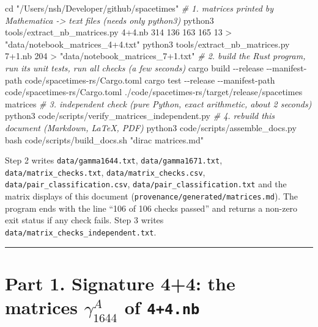 \documentclass[
  10pt,
]{article}
\newenvironment{Shaded}{}{}
\newcommand{\AttributeTok}[1]{\textcolor[rgb]{0.49,0.56,0.16}{#1}}
\newcommand{\BuiltInTok}[1]{\textcolor[rgb]{0.00,0.50,0.00}{#1}}
\newcommand{\CommentTok}[1]{\textcolor[rgb]{0.38,0.63,0.69}{\textit{#1}}}
\newcommand{\ExtensionTok}[1]{#1}
\newcommand{\FunctionTok}[1]{\textcolor[rgb]{0.02,0.16,0.49}{#1}}
\newcommand{\NormalTok}[1]{#1}
\newcommand{\OperatorTok}[1]{\textcolor[rgb]{0.40,0.40,0.40}{#1}}
\newcommand{\StringTok}[1]{\textcolor[rgb]{0.25,0.44,0.63}{#1}}
\begin{document}
\begin{Shaded}
\begin{Highlighting}[]
\BuiltInTok{cd} \StringTok{"/Users/nsh/Developer/github/spacetimes"}
\CommentTok{\# 1. matrices printed by Mathematica {-}\textgreater{} text files (needs only python3)}
\ExtensionTok{python3}\NormalTok{ tools/extract\_nb\_matrices.py 4+4.nb 314 136 163 165 13 }\OperatorTok{\textgreater{}} \StringTok{"data/notebook\_matrices\_4+4.txt"}
\ExtensionTok{python3}\NormalTok{ tools/extract\_nb\_matrices.py 7+1.nb 204 }\OperatorTok{\textgreater{}} \StringTok{"data/notebook\_matrices\_7+1.txt"}
\CommentTok{\# 2. build the Rust program, run its unit tests, run all checks (a few seconds)}
\ExtensionTok{cargo}\NormalTok{ build }\AttributeTok{{-}{-}release} \AttributeTok{{-}{-}manifest{-}path}\NormalTok{ code/spacetimes{-}rs/Cargo.toml}
\ExtensionTok{cargo}\NormalTok{ test  }\AttributeTok{{-}{-}release} \AttributeTok{{-}{-}manifest{-}path}\NormalTok{ code/spacetimes{-}rs/Cargo.toml}
\ExtensionTok{./code/spacetimes{-}rs/target/release/spacetimes}\NormalTok{ matrices}
\CommentTok{\# 3. independent check (pure Python, exact arithmetic, about 2 seconds)}
\ExtensionTok{python3}\NormalTok{ code/scripts/verify\_matrices\_independent.py}
\CommentTok{\# 4. rebuild this document (Markdown, LaTeX, PDF)}
\ExtensionTok{python3}\NormalTok{ code/scripts/assemble\_docs.py}
\FunctionTok{bash}\NormalTok{ code/scripts/build\_docs.sh }\StringTok{"dirac matrices.md"}
\end{Highlighting}
\end{Shaded}

Step 2 writes \texttt{data/gamma1644.txt}, \texttt{data/gamma1671.txt},
\texttt{data/matrix\_checks.txt}, \texttt{data/matrix\_checks.csv},
\texttt{data/pair\_classification.csv},
\texttt{data/pair\_classification.txt} and the matrix displays of this
document (\texttt{provenance/generated/matrices.md}). The program ends
with the line ``106 of 106 checks passed'' and returns a non-zero exit
status if any check fails. Step 3 writes
\texttt{data/matrix\_checks\_independent.txt}.

\begin{center}\rule{0.5\linewidth}{0.5pt}\end{center}

\hypertarget{part-1.-signature-44-the-matrices-gamma_1644a-of-44.nb}{%
\section{\texorpdfstring{Part 1. Signature 4+4: the matrices
\(\gamma_{1644}^A\) of
\texttt{4+4.nb}}{Part 1. Signature 4+4: the matrices \textbackslash gamma\_\{1644\}\^{}A of 4+4.nb}}\label{part-1.-signature-44-the-matrices-gamma_1644a-of-44.nb}}
\end{document}
